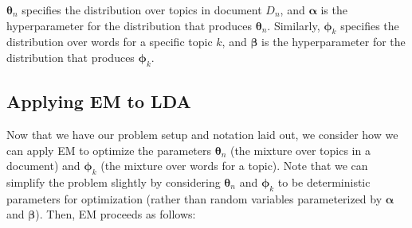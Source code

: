 $\boldsymbol{\theta}_n$ specifies the distribution over topics in document $D_n$, and $\boldsymbol{\alpha}$ is the hyperparameter for the distribution that produces $\boldsymbol{\theta}_n$. Similarly, $\boldsymbol{\phi}_k$ specifies the distribution over words for a specific topic $k$, and $\boldsymbol{\beta}$ is the hyperparameter for the distribution that produces $\boldsymbol{\phi}_k$.

\subsection{Applying EM to LDA}
Now that we have our problem setup and notation laid out, we consider how we can apply EM to optimize the parameters $\boldsymbol{\theta}_n$ (the mixture over topics in a document) and $\boldsymbol{\phi}_k$ (the mixture over words for a topic). Note that we can simplify the problem slightly by considering $\boldsymbol{\theta}_n$ and $\boldsymbol{\phi}_k$ to be deterministic parameters for optimization (rather than random variables parameterized by $\boldsymbol{\alpha}$ and $\boldsymbol{\beta}$). Then, EM proceeds as follows:

